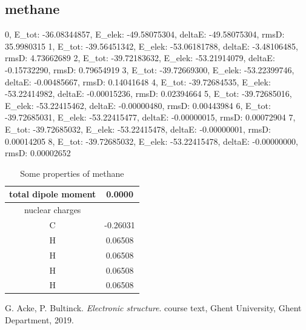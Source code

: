 \subsection{methane}
\label{subsec:methane}
 
\begin{python}[caption={iterations for methane},label={ls:Listing 8},basicstyle=\scriptsize]
0, E_tot: -36.08344857, E_elek: -49.58075304, deltaE: -49.58075304, rmsD:  35.9980315
1, E_tot: -39.56451342, E_elek: -53.06181788, deltaE: -3.48106485, rmsD:  4.73662689
2, E_tot: -39.72183632, E_elek: -53.21914079, deltaE: -0.15732290, rmsD:  0.79654919
3, E_tot: -39.72669300, E_elek: -53.22399746, deltaE: -0.00485667, rmsD:  0.14041648
4, E_tot: -39.72684535, E_elek: -53.22414982, deltaE: -0.00015236, rmsD:  0.02394664
5, E_tot: -39.72685016, E_elek: -53.22415462, deltaE: -0.00000480, rmsD:  0.00443984
6, E_tot: -39.72685031, E_elek: -53.22415477, deltaE: -0.00000015, rmsD:  0.00072904
7, E_tot: -39.72685032, E_elek: -53.22415478, deltaE: -0.00000001, rmsD:  0.00014205
8, E_tot: -39.72685032, E_elek: -53.22415478, deltaE: -0.00000000, rmsD:  0.00002652
\end{python}
 
 \begin{table}[ht]
    \centering
    \begin{tabular}{c|c}
         total dipole moment & 0.0000  \\
         \hline
         nuclear charges &  \\ 
         \hline
         C & -0.26031 \\
         H & 0.06508 \\
         H & 0.06508 \\
         H & 0.06508\\
         H & 0.06508 \\
    \end{tabular}
    \caption{Some properties of methane}
    \label{tab:number2}
\end{table}

\begin{thebibliography}{9}
    G. Acke, P. Bultinck. 
    \textit{Electronic structure}. 
    course text, Ghent University, Ghent Department, 2019.
\end{thebibliography}